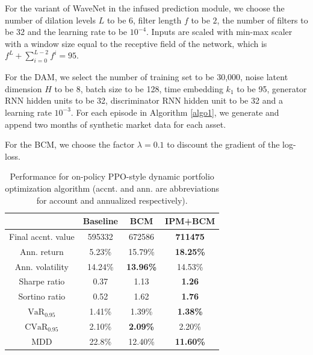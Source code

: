 \documentclass{article}
\begin{document}
For the variant of WaveNet \cite{pmlr-v80-oord18a} in the infused prediction module, we choose the number of dilation levels $L$ to be 6, filter length $f$ to be $2$, the number of filters to be 32 and the learning rate to be $10^{-4}$. Inputs are scaled with min-max scaler with a window size equal to the receptive field of the network, which is $f^L+\sum^{L-2}_{i=0} f^i=95$.

For the DAM, we select the number of training set to be 30,000, noise latent dimension $H$ to be 8, batch size to be 128, time embedding $k_1$ to be 95, generator RNN hidden units to be 32, discriminator RNN hidden unit to be 32 and a learning rate $10^{-3}$. For each episode in Algorithm \ref{algo1}, we generate and append two months of synthetic market data for each asset.

For the BCM, we choose the factor $\lambda=0.1$ to discount the gradient of the log-loss.
\begin{table}[t]
\caption{Performance for on-policy PPO-style dynamic portfolio optimization algorithm (accnt. and ann. are abbreviations for account and annualized respectively). }
\label{performance_ppo}
\begin{center}
\begin{small}
\begin{tabular}{|c|c|c|c|}
\hline
                      & Baseline & BCM              & IPM+BCM          \\ \hline
Final accnt. value   & 595332   & 672586           & \textbf{711475}  \\ \hline
Ann. return     & 5.23\%   & 15.79\%          & \textbf{18.25\%} \\ \hline
Ann. volatility & 14.24\%  & \textbf{13.96\%} & 14.53\%          \\ \hline
Sharpe ratio          & 0.37     & 1.13             & \textbf{1.26}    \\ \hline
Sortino ratio         & 0.52     & 1.62             & \textbf{1.76}    \\ \hline
$\text{VaR}_{0.95}$                   & 1.41\%   & 1.39\%           & \textbf{1.38\%}  \\ \hline
$\text{CVaR}_{0.95}$                 & 2.10\%   & \textbf{2.09\%}  & 2.20\%           \\ \hline
MDD                   & 22.8\%   & 12.40\%          & \textbf{11.60\%} \\ \hline
\end{tabular}
\end{small}
\end{center}
\end{table}
\end{document}
